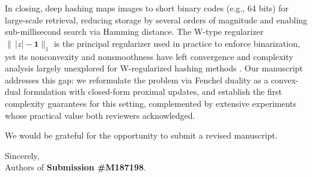 \documentclass[11pt]{article}
\newcommand{\blue}[1]{\textcolor{blue}{#1}}
\begin{document}

\bigskip

In closing, deep hashing maps images to short binary codes (e.g., 64 bits) for large-scale retrieval, reducing storage by several orders of magnitude and enabling
sub-millisecond search via Hamming distance. The W-type regularizer
$\|\,|z|-\mathbf{1}\|_1$ is the principal regularizer used in practice to enforce
binarization, yet its nonconvexity and nonsmoothness have left convergence and
complexity analysis largely unexplored for W-regularized hashing methods \cite{liu2016dsh,zhu2016dhn,wang2023mds,chen2025shc}. Our manuscript addresses
this gap: we reformulate the problem via Fenchel duality as a convex-dual formulation with
closed-form proximal updates, and establish the first complexity guarantees for
this setting, complemented by extensive experiments whose practical value both
reviewers acknowledged.

We would be grateful for the opportunity to submit a revised manuscript. 

\vspace{1.5em}

\noindent Sincerely,\\
Authors of \textbf{Submission \#M187198}.





\end{document}
